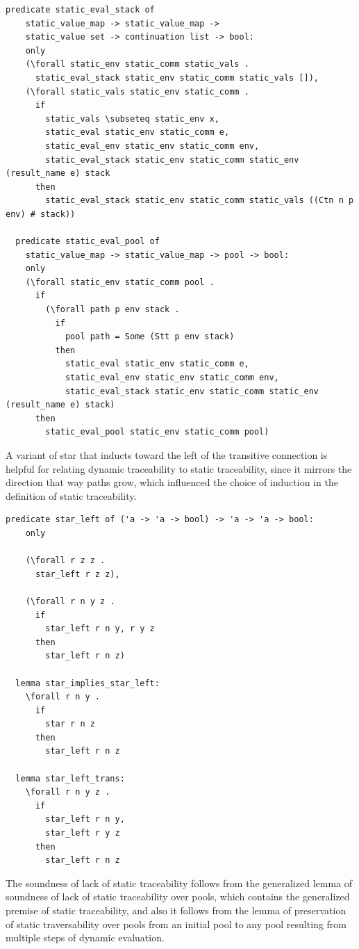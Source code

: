 \documentclass[10pt]{article}
\begin{document}
\begin{lstlisting}[language=logic, mathescape]
  predicate static_eval_stack of
    static_value_map -> static_value_map ->
    static_value set -> continuation list -> bool:
    only 
    (\forall static_env static_comm static_vals .
      static_eval_stack static_env static_comm static_vals []),
    (\forall static_vals static_env static_comm . 
      if 
        static_vals \subseteq static_env x,
        static_eval static_env static_comm e,
        static_eval_env static_env static_comm env,
        static_eval_stack static_env static_comm static_env (result_name e) stack 
      then
        static_eval_stack static_env static_comm static_vals ((Ctn n p env) # stack))

  predicate static_eval_pool of
    static_value_map -> static_value_map -> pool -> bool:
    only
    (\forall static_env static_comm pool .
      if
        (\forall path p env stack .
          if
            pool path = Some (Stt p env stack)
          then 
            static_eval static_env static_comm e,
            static_eval_env static_env static_comm env,
            static_eval_stack static_env static_comm static_env (result_name e) stack)
      then 
        static_eval_pool static_env static_comm pool)
  \end{lstlisting}


A variant of star that inducts toward the left of the transitive connection is helpful for
relating dynamic traceability to static traceability, since it mirrors the direction that way
paths grow, which influenced the choice of induction in the definition of static
traceability.

\begin{lstlisting}[language=logic, mathescape]
  predicate star_left of ('a -> 'a -> bool) -> 'a -> 'a -> bool:
    only

    (\forall r z z .
      star_left r z z),

    (\forall r n y z .
      if
        star_left r n y, r y z
      then
        star_left r n z)

  lemma star_implies_star_left:
    \forall r n y .
      if
        star r n z
      then
        star_left r n z

  lemma star_left_trans:
    \forall r n y z .
      if 
        star_left r n y,
        star_left r y z 
      then
        star_left r n z
\end{lstlisting}

The soundness of lack of static traceability follows from the generalized lemma
of soundness of lack of static traceability over pools, which contains
the generalized premise of
static traceability, and also it follows from the lemma of preservation of static
traversability over pools from an initial pool to any pool resulting from multiple steps of
dynamic evaluation.
\end{document}
